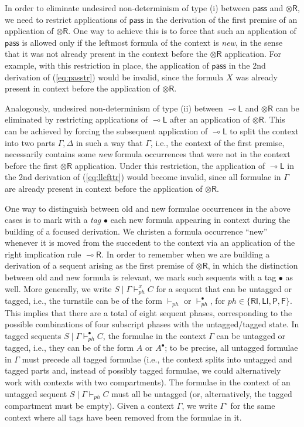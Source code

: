 \documentclass[copyright,creativecommons]{eptcs}
\theoremstyle{definition}
\newcommand{\tr}{\otimes \mathsf{R}}
\newcommand{\lright}{{\multimap}\mathsf{R}}
\newcommand{\lleft}{{\multimap}\mathsf{L}}
\newcommand{\pass}{\mathsf{pass}}
\newcommand{\RI}{\mathsf{RI}}
\newcommand{\LI}{\mathsf{LI}}
\newcommand{\Pass}{\mathsf{P}}
\newcommand{\F}{\mathsf{F}}
\newcommand{\xvdash}{\vdash^{x}}
\begin{document}
In order to eliminate undesired non-determinism of type (i) between $\pass$ and $\tr$, we need to restrict applications of $\pass$ in the derivation of the first premise of an application of $\tr$.
One way to achieve this is to force that such an application of $\pass$ is allowed only if the leftmost formula of the context is \emph{new}, in the sense that it was not already present in the context before the $\tr$ application. For example, with this restriction in place, the application of $\pass$ in the 2nd derivation of (\ref{eq:passtr}) would be invalid, since the formula $X$ was already present in context before the application of $\tr$.

Analogously, undesired non-determinism of type (ii) between $\lleft$ and $\tr$ can be eliminated by restricting applications of $\lleft$ after an application of $\tr$. This can be achieved by forcing the subsequent application of $\lleft$ to split the context into two parts $\Gamma,\Delta$ in such a way that $\Gamma$, i.e., the context of the first premise, necessarily contains some \emph{new} formula occurrences that were not in the context before the first $\tr$ application. Under this restriction, the application of $\lleft$ in the 2nd derivation of (\ref{eq:llefttr}) would become invalid, since all formulae in $\Gamma$ are already present in context before the application of $\tr$.

One way to distinguish between old and new formulae occurrences in the above cases is to mark with a \emph{tag} $\bullet$ each new formula appearing in context during the building of a focused derivation. We christen a formula occurrence ``new'' whenever it is moved from the succedent to the context via an application of the right implication rule $\lright$. In order to remember when we are building a derivation of a sequent arising as the first premise of $\tr$, in which the distinction between old and new formula is relevant, we mark such sequents with a tag $\bullet$ as well.
More generally, we write $S \mid \Gamma \xvdash_{ph} C$ for a sequent that can be untagged or tagged, i.e., the turnstile can be of the form $\vdash_{ph}$ or $\vdash^\bullet_{ph}$, for $ph \in \{ \RI,\LI,\Pass,\F\}$. This implies that there are a total of eight sequent phases, corresponding to the possible combinations of four subscript phases with the untagged/tagged state.
In tagged sequents  $S \mid \Gamma \vdash_{ph}^{\bullet} C$, the formulae in the context $\Gamma$ can be untagged or tagged, i.e., they can be of the form $A$ or $A^\bullet$; to be precise, all untagged formulae in $\Gamma$ must precede all tagged formulae (i.e., the context splits into untagged and tagged parts and, instead of possibly tagged formulae, we could alternatively work with contexts with two compartments). The formulae in the context of an untagged sequent $S \mid \Gamma \vdash_{ph} C$ must all be untagged (or, alternatively, the tagged compartment must be empty). Given a context $\Gamma$, we write $\Gamma^{\circ}$ for the same context where all tags have been removed from the formulae in it.
\end{document}
